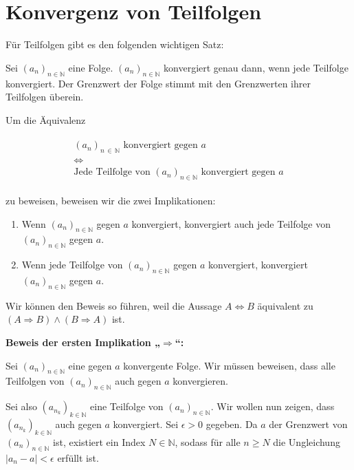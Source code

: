 \documentclass[fontsize=9pt,
               parskip=half-,
               DIV=14,
               listof=chapterentry,
               tocflat]{scrbook}
\newenvironment{indentblock}{\begin{adjustwidth}{.5cm}{}}{\end{adjustwidth}}
\newcommand{\proofstep}[1]{\textbf{\textcolor{sblau}{#1}}}
\begin{document}
\section{Konvergenz von Teilfolgen}

Für Teilfolgen gibt es den folgenden wichtigen Satz:

\begin{theorem*}
Sei $(a_{n})_{n\in \mathbb {N} }$ eine Folge. $(a_{n})_{n\in \mathbb {N} }$ konvergiert genau dann, wenn jede Teilfolge konvergiert. Der Grenzwert der Folge stimmt mit den Grenzwerten ihrer Teilfolgen überein.

\end{theorem*}

\begin{proof*}
Um die Äquivalenz

\begin{align*}
{\begin{array}{c}(a_{n})_{n\,\in \,\mathbb {N} }{\text{ konvergiert gegen }}a\\[1ex]\Leftrightarrow \\[1ex]{\text{Jede Teilfolge von }}(a_{n})_{n\in \mathbb {N} }{\text{ konvergiert gegen }}a\end{array}}
\end{align*}

zu beweisen, beweisen wir die zwei Implikationen:

\begin{enumerate}
\item Wenn $(a_{n})_{n\in \mathbb {N} }$ gegen $a$ konvergiert, konvergiert auch jede Teilfolge von $(a_{n})_{n\in \mathbb {N} }$ gegen $a$.
\item Wenn jede Teilfolge von $(a_{n})_{n\in \mathbb {N} }$ gegen $a$ konvergiert, konvergiert $(a_{n})_{n\in \mathbb {N} }$ gegen $a$.
\end{enumerate}

Wir können den Beweis so führen, weil die Aussage $A\Leftrightarrow B$ äquivalent zu $(A\Rightarrow B)\land (B\Rightarrow A)$ ist.

\proofstep{Beweis der ersten Implikation „$\Rightarrow $“:}
 \begin{indentblock}
Sei $(a_{n})_{n\in \mathbb {N} }$ eine gegen $a$ konvergente Folge. Wir müssen beweisen, dass alle Teilfolgen von $(a_{n})_{n\in \mathbb {N} }$ auch gegen $a$ konvergieren.

Sei also $\left(a_{n_{k}}\right)_{k\in \mathbb {N} }$ eine Teilfolge von $(a_{n})_{n\in \mathbb {N} }$. Wir wollen nun zeigen, dass $\left(a_{n_{k}}\right)_{k\in \mathbb {N} }$ auch gegen $a$ konvergiert. Sei $\epsilon >0$ gegeben. Da $a$ der Grenzwert von $(a_{n})_{n\in \mathbb {N} }$ ist, existiert ein Index $N\in \mathbb {N} $, sodass für alle $n\geq N$ die Ungleichung $|a_{n}-a|<\epsilon $ erfüllt ist.


\end{indentblock}
\end{proof*}
\end{document}
